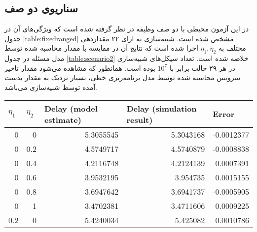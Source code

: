 \subsection{سناریوی دو صف}
در این آزمون محیطی با دو صف وظیفه در نظر گرفته شده است که ویژگی‌های آن در جدول \ref{table:fixedranged} مشخص شده است. شبیه‌سازی به ازای ۲۲ مقداردهی مختلف به $\eta_1, \eta_2$ اجرا شده است که نتایج آن در مقایسه با مقدار محاسبه شده توسط مدل مسئله در جدول \ref{table:scenario2} خلاصه شده است. تعداد سیکل‌های شبیه‌سازی در هر ۲۹ حالت برابر با $10^7$ بوده است. همانطور که مشاهده می‌شود مقدار تاخیر سرویس محاسبه شده توسط مدل برنامه‌ریزی خطی، بسیار نزدیک به مقدار بدست آمده توسط شبیه‌سازی می‌باشد.
\begin{table}[]
	\centering
	\begin{latin}
		\begin{tabular}{@{}rrrrr@{}}
			\toprule
			\multicolumn{1}{l}{$\eta_1$} & \multicolumn{1}{l}{$\eta_2$} & \multicolumn{1}{l}{Delay (model estimate)} & \multicolumn{1}{l}{Delay (simulation result)} & \multicolumn{1}{l}{Error} \\ \midrule
			0                        & 0                        & 5.3055545                                  & 5.3043168                                     & -0.0012377                \\
			0                        & 0.2                      & 4.5749717                                  & 4.5740879                                     & -0.0008838                \\
			0                        & 0.4                      & 4.2116748                                  & 4.2124139                                     & 0.0007391                 \\
			0                        & 0.6                      & 3.9532195                                  & 3.954735                                      & 0.0015155                 \\
			0                        & 0.8                      & 3.6947642                                  & 3.6941737                                     & -0.0005905                \\
			0                        & 1                        & 3.4702381                                  & 3.4711606                                     & 0.0009225                 \\
			0.2                      & 0                        & 5.4240034                                  & 5.425082                                      & 0.0010786                 \\

\end{tabular}
\end{latin}
\end{table}
